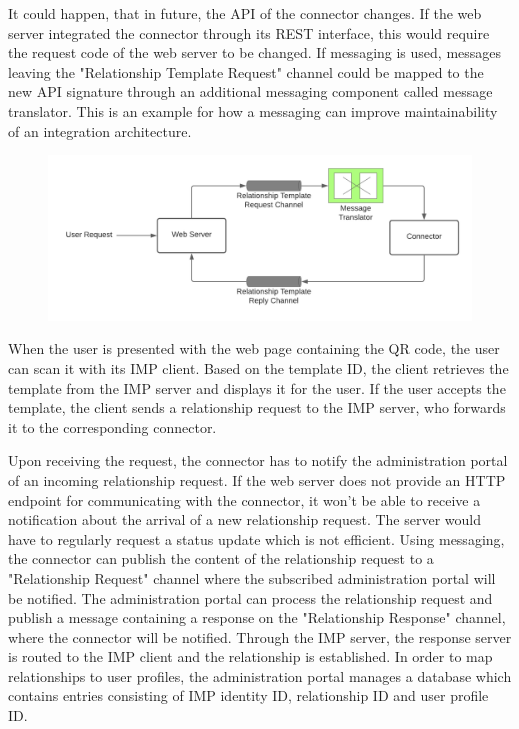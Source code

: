 \documentclass[
     12pt,         %
     a4paper,      %
     BCOR=10mm,version=first,     %
     DIV=14,version=first,        %
     ]{scrreprt}
\begin{document}
It could happen, that in future, the API of the connector changes. If the web server integrated the connector through its REST interface, this would require the request code of the web server to be changed. If messaging is used, messages leaving the "Relationship Template Request" channel could be mapped to the new API signature through an additional messaging component called message translator. This is an example for how a messaging can improve maintainability of an integration architecture.

\begin{figure}[h]
    \centering
    \includegraphics[scale=0.3]{Diagrams/Integration Architecture 1/Overview/Relationship Template Messaging Improved.png}
\end{figure}


When the user is presented with the web page containing the QR code, the user can scan it with its IMP client. Based on the template ID, the client retrieves the template from the IMP server and displays it for the user. If the user accepts the template, the client sends a relationship request to the IMP server, who forwards it to the corresponding connector.

Upon receiving the request, the connector has to notify the administration portal of an incoming relationship request. If the web server does not provide an HTTP endpoint for communicating with the connector, it won't be able to receive a notification about the arrival of a new relationship request. The server would have to regularly request a status update which is not efficient. Using messaging, the connector can publish the content of the relationship request to a "Relationship Request" channel where the subscribed administration portal will be notified. The administration portal can process the relationship request and publish a message containing a response on the "Relationship Response" channel, where the connector will be notified. Through the IMP server, the response server is routed to the IMP client and the relationship is established.
In order to map relationships to user profiles, the administration portal manages a database which contains entries consisting of IMP identity ID, relationship ID and user profile ID.
\end{document}
